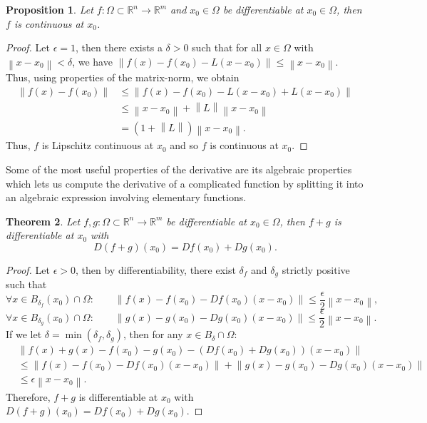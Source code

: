 \documentclass{article}
\theoremstyle{plain}
\newtheorem{theorem}{Theorem}[subsection]
\newtheorem{proposition}[theorem]{Proposition}
\theoremstyle{definition}
\newcommand{\R}{\mathbb{R}}
\newcommand{\norm}[1]{\left\lVert#1 \right\rVert}
\begin{document}
\begin{proposition}
    Let $f : \Omega \subset \R^n \to \R^m$ and $x_0 \in \Omega$ be differentiable at $x_0 \in \Omega$, then $f$ is continuous at $x_0$.
\end{proposition}

\begin{proof}
    Let $\epsilon = 1$, then there exists a $\delta > 0$ such that for all $x \in \Omega$ with $\norm{x - x_0} < \delta$, we have $\norm{f(x) - f(x_0) - L(x - x_0)} \leq \norm{x - x_0}$. Thus, using properties of the matrix-norm, we obtain
    \begin{align*}
        \norm{f(x) - f(x_0)} &\leq \norm{f(x) - f(x_0) - L(x - x_0) + L(x - x_0)} \\
        &\leq \norm{x - x_0} + \norm{L} \norm{x - x_0} \\
        &= (1 + \norm{L}) \norm{x - x_0}.
    \end{align*}
    Thus, $f$ is Lipschitz continuous at $x_0$ and so $f$ is continuous at $x_0$.
\end{proof}

Some of the most useful properties of the derivative are its algebraic properties which lets us compute the derivative of a complicated function by splitting it into an algebraic expression involving elementary functions.

\begin{theorem}
    Let $f,g : \Omega \subset \R^n \to \R^m$ be differentiable at $x_0 \in \Omega$, then $f+g$ is differentiable at $x_0$ with
    $$D(f+g)(x_0) = Df(x_0) + Dg(x_0).$$
\end{theorem}

\begin{proof}
    Let $\epsilon > 0$, then by differentiability, there exist $\delta_f$ and $\delta_g$ strictly positive such that 
    $$\forall x \in B_{\delta_f}(x_0) \cap \Omega : \qquad \norm{f(x) - f(x_0) - Df(x_0)(x - x_0)} \leq \frac{\epsilon}{2}\norm{x - x_0},$$
    $$\forall x \in B_{\delta_g}(x_0) \cap \Omega : \qquad \norm{g(x) - g(x_0) - Dg(x_0)(x - x_0)} \leq \frac{\epsilon}{2}\norm{x - x_0}.$$
    If we let $\delta = \min(\delta_f, \delta_g)$, then for any $x \in B_{\delta} \cap \Omega$:
    \begin{align*}
        &\norm{f(x) + g(x) - f(x_0)-g(x_0) - (Df(x_0) + Dg(x_0))(x - x_0)} \\
        &\leq \norm{f(x) - f(x_0) - Df(x_0)(x - x_0)} + \norm{g(x) - g(x_0) - Dg(x_0)(x - x_0)} \\
        &\leq \epsilon \norm{x - x_0}.
    \end{align*}
    Therefore, $f+g$ is differentiable at $x_0$ with $D(f+g)(x_0) = Df(x_0) + Dg(x_0)$. 
\end{proof}
\end{document}
